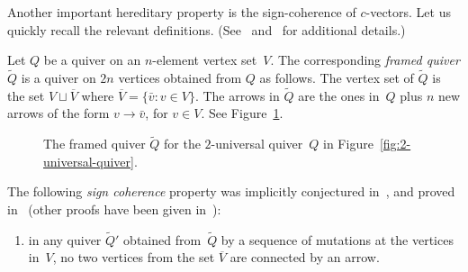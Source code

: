 \documentclass[ALCO,ThmDefs,Unicode,epreuves,published]{cedram}
\begin{document}

Another important %
hereditary property is the sign-coherence of $c$-vectors. 
Let us quickly recall the relevant definitions. 
(See~\cite{nakanishi-zelevinsky} and~\cite{ca4, keller-fpsac13} for additional details.)

\begin{definition}
Let $Q$ be a quiver on an $n$-element vertex set~$V$. 
The corresponding \emph{framed quiver} $\widetilde Q$ is a quiver on $2n$ vertices
obtained from $Q$ as follows. 
The vertex set of $\widetilde Q$ is the set $V\sqcup \overline V$ where 
$\overline V=\{\bar v:v\in V\}$. The arrows in $\widetilde Q$ are the ones in~$Q$ plus 
$n$ new arrows of the form $v\to \bar v$, for $v\in V$. 
See Figure~\ref{fig:2-universal-quiver-framed}. 
\end{definition}

\begin{figure}[ht]\centering

\caption{The framed quiver $\widetilde Q$ for the $2$-universal quiver~$Q$ in Figure~\ref{fig:2-universal-quiver}. }
\label{fig:2-universal-quiver-framed}
\end{figure}


The following \emph{sign coherence} property was implicitly conjectured in~\cite{ca4}, and proved in~\cite{DWZ2}
(other proofs have been given in~\cite{GHKK, Nagao}):
\begin{enumerate}[label=(SC)]
\item\label{SC} %
in any quiver $\widetilde Q'$ obtained from~$\widetilde Q$ by a sequence of mutations
at the vertices in~$V$, 
no two vertices from the set $\overline V$ are connected by an arrow. 
\end{enumerate}
\end{document}
